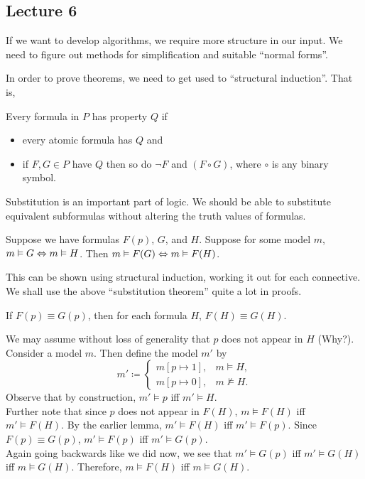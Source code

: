 \subsection{Lecture 6}

If we want to develop algorithms, we require more structure in our input. We need to figure out methods for simplification and suitable ``normal forms''.

In order to prove theorems, we need to get used to ``structural induction''. That is,

\begin{theorem}
	Every formula in $P$ has property $Q$ if
	\begin{itemize}
		\item every atomic formula has $Q$ and
		\item if $F,G\in P$ have $Q$ then so do $\neg F$ and $(F\circ G)$, where $\circ$ is any binary symbol.
	\end{itemize}
\end{theorem}

Substitution is an important part of logic. We should be able to substitute equivalent subformulas without altering the truth values of formulas.\\

\begin{lemma}
\label{lem: 6.2}
	Suppose we have formulas $F(p)$, $G$, and $H$. Suppose for some model $m$, $m\vDash G\Leftrightarrow m\vDash H$. Then $m\vDash F(G) \Leftrightarrow m\vDash F(H)$.
\end{lemma}
This can be shown using structural induction, working it out for each connective.\\
We shall use the above ``substitution theorem'' quite a lot in proofs.

\begin{lemma}
	If $F(p)\equiv G(p)$, then for each formula $H$, $F(H)\equiv G(H)$.
\end{lemma}
We may assume without loss of generality that $p$ does not appear in $H$ (Why?). Consider a model $m$. Then define the model $m'$ by
\[
	m'\coloneqq
	\begin{cases}
		m[p\mapsto 1], & m\vDash H, \\
		m[p\mapsto 0], & m\nvDash H.
	\end{cases}
\]
Observe that by construction, $m'\vDash p$ iff $m'\vDash H$.\\
Further note that since $p$ does not appear in $F(H)$, $m\vDash F(H)$ iff $m'\vDash F(H)$. By the earlier lemma, $m'\vDash F(H)$ iff $m'\vDash F(p)$. Since $F(p)\equiv G(p)$, $m'\vDash F(p)$ iff $m'\vDash G(p)$.\\
Again going backwards like we did now, we see that $m'\vDash G(p)$ iff $m'\vDash G(H)$ iff $m\vDash G(H)$. Therefore, $m\vDash F(H)$ iff $m\vDash G(H)$.

